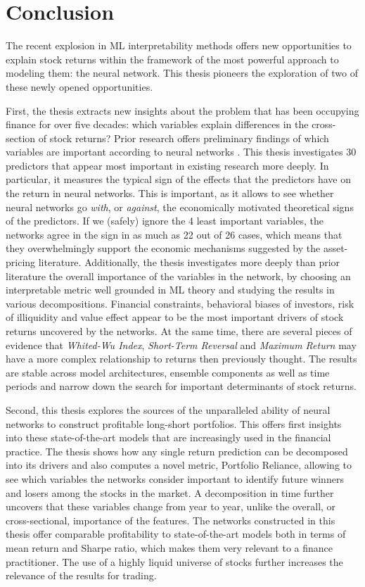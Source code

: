 \chapter{Conclusion}
\label{con}

The recent explosion in ML interpretability methods offers new opportunities to explain stock returns within the framework of the most powerful approach to modeling them: the neural network. This thesis pioneers the exploration of two of these newly opened opportunities.

First, the thesis extracts new insights about the problem that has been occupying finance for over five decades: which variables explain differences in the cross-section of stock returns? Prior research offers preliminary findings of which variables are important according to neural networks \citep{gu2020empirical, tobek2020does}. This thesis investigates 30 predictors that appear most important in existing research more deeply. In particular, it measures the typical sign of the effects that the predictors have on the return in neural networks. This is important, as it allows to see whether neural networks go \textit{with}, or \textit{against}, the economically motivated theoretical signs of the predictors. If we (safely) ignore the 4 least important variables, the networks agree in the sign in as much as 22 out of 26 cases, which means that they overwhelmingly support the economic mechanisms suggested by the asset-pricing literature. Additionally, the thesis investigates more deeply than prior literature the overall importance of the variables in the network, by choosing an interpretable metric well grounded in ML theory and studying the results in various decompositions. Financial constraints, behavioral biases of investors, risk of illiquidity and value effect appear to be the most important drivers of stock returns uncovered by the networks. At the same time, there are several pieces of evidence that \textit{Whited-Wu Index}, \textit{Short-Term Reversal} and \textit{Maximum Return} may have a more complex relationship to returns then previously thought. The results are stable across model architectures, ensemble components as well as time periods and narrow down the search for important determinants of stock returns.

Second, this thesis explores the sources of the unparalleled ability of neural networks to construct profitable long-short portfolios. This offers first insights into these state-of-the-art models that are increasingly used in the financial practice. The thesis shows how any single return prediction can be decomposed into its drivers and also computes a novel metric, Portfolio Reliance, allowing to see which variables the networks consider important to identify future winners and losers among the stocks in the market. A decomposition in time further uncovers that these variables change from year to year, unlike the overall, or cross-sectional, importance of the features. The networks constructed in this thesis offer comparable profitability to state-of-the-art models both in terms of mean return and Sharpe ratio, which makes them very relevant to a finance practitioner. The use of a highly liquid universe of stocks further increases the relevance of the results for trading.   


